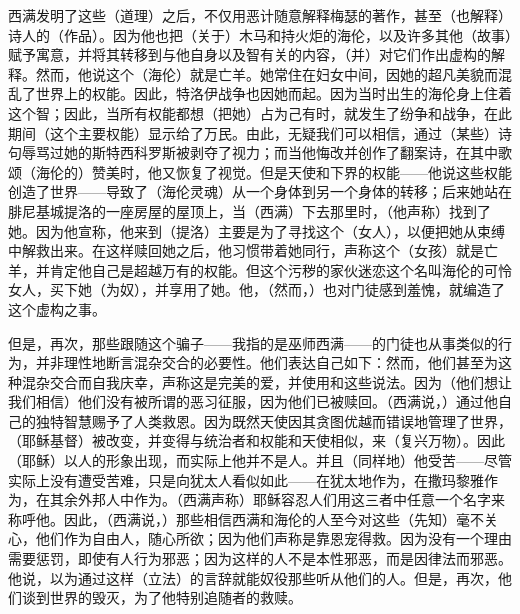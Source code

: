 西满发明了这些（道理）之后，不仅用恶计随意解释梅瑟的著作，甚至（也解释）诗人的（作品）。因为他也把（关于）木马和持火炬的海伦，以及许多其他（故事）赋予寓意，并将其转移到与他自身以及智有关的内容，（并）对它们作出虚构的解释。然而，他说这个（海伦）就是亡羊。她常住在妇女中间，因她的超凡美貌而混乱了世界上的权能。因此，特洛伊战争也因她而起。因为当时出生的海伦身上住着这个智；因此，当所有权能都想（把她）占为己有时，就发生了纷争和战争，在此期间（这个主要权能）显示给了万民。由此，无疑我们可以相信，通过（某些）诗句辱骂过她的斯特西科罗斯被剥夺了视力；而当他悔改并创作了翻案诗，在其中歌颂（海伦的）赞美时，他又恢复了视觉。但是天使和下界的权能——他说这些权能创造了世界——导致了（海伦灵魂）从一个身体到另一个身体的转移；后来她站在腓尼基城提洛的一座房屋的屋顶上，当（西满）下去那里时，（他声称）找到了她。因为他宣称，他来到（提洛）主要是为了寻找这个（女人），以便把她从束缚中解救出来。在这样赎回她之后，他习惯带着她同行，声称这个（女孩）就是亡羊，并肯定他自己是超越万有的权能。但这个污秽的家伙迷恋这个名叫海伦的可怜女人，买下她（为奴），并享用了她。他，（然而，）也对门徒感到羞愧，就编造了这个虚构之事。\par

但是，再次，那些跟随这个骗子——我指的是巫师西满——的门徒也从事类似的行为，并非理性地断言混杂交合的必要性。他们表达自己如下：然而，他们甚至为这种混杂交合而自我庆幸，声称这是完美的爱，并使用和这些说法。因为（他们想让我们相信）他们没有被所谓的恶习征服，因为他们已被赎回。（西满说，）通过他自己的独特智慧赐予了人类救恩。因为既然天使因其贪图优越而错误地管理了世界，（耶稣基督）被改变，并变得与统治者和权能和天使相似，来（复兴万物）。因此（耶稣）以人的形象出现，而实际上他并不是人。并且（同样地）他受苦——尽管实际上没有遭受苦难，只是向犹太人看似如此——在犹太地作为，在撒玛黎雅作为，在其余外邦人中作为。（西满声称）耶稣容忍人们用这三者中任意一个名字来称呼他。因此，（西满说，）那些相信西满和海伦的人至今对这些（先知）毫不关心，他们作为自由人，随心所欲；因为他们声称是靠恩宠得救。因为没有一个理由需要惩罚，即使有人行为邪恶；因为这样的人不是本性邪恶，而是因律法而邪恶。他说，以为通过这样（立法）的言辞就能奴役那些听从他们的人。但是，再次，他们谈到世界的毁灭，为了他特别追随者的救赎。\par


